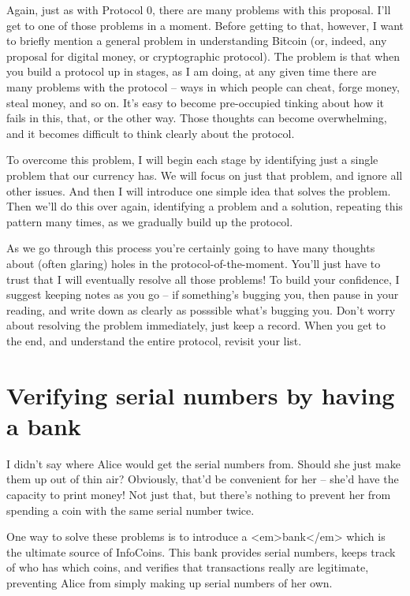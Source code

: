 Again, just as with Protocol 0, there are many problems with this
proposal.  I'll get to one of those problems in a moment.  Before
getting to that, however, I want to briefly mention a general problem
in understanding Bitcoin (or, indeed, any proposal for digital money,
or cryptographic protocol).  The problem is that when you build a
protocol up in stages, as I am doing, at any given time there are many
problems with the protocol -- ways in which people can cheat, forge
money, steal money, and so on.  It's easy to become pre-occupied
tinking about how it fails in this, that, or the other way.  Those
thoughts can become overwhelming, and it becomes difficult to think
clearly about the protocol.

To overcome this problem, I will begin each stage by identifying just
a single problem that our currency has.  We will focus on just that
problem, and ignore all other issues.  And then I will introduce one
simple idea that solves the problem.  Then we'll do this over again,
identifying a problem and a solution, repeating this pattern many
times, as we gradually build up the protocol.

As we go through this process you're certainly going to have many
thoughts about (often glaring) holes in the protocol-of-the-moment.
You'll just have to trust that I will eventually resolve all those
problems!  To build your confidence, I suggest keeping notes as you go
-- if something's bugging you, then pause in your reading, and write
down as clearly as posssible what's bugging you.  Don't worry about
resolving the problem immediately, just keep a record.  When you get
to the end, and understand the entire protocol, revisit your list.

\section{Verifying serial numbers by having a bank}

I didn't say where Alice would get the serial numbers from.  Should
she just make them up out of thin air?  Obviously, that'd be
convenient for her -- she'd have the capacity to print money!  Not
just that, but there's nothing to prevent her from spending a coin
with the same serial number twice.

One way to solve these problems is to introduce a <em>bank</em> which
is the ultimate source of InfoCoins.  This bank provides serial
numbers, keeps track of who has which coins, and verifies that
transactions really are legitimate, preventing Alice from simply
making up serial numbers of her own.

